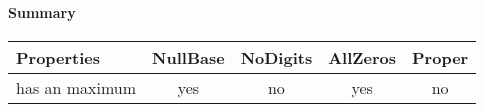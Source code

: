 \documentclass[\main/thesis.tex]{subfiles}
\begin{document}
\paragraph{Summary}

\begin{center}
    \begin{adjustbox}{max width=\textwidth}
    \begin{tabular}{ | l | c | c | c | c | }
    \textbf{Properties} & \textbf{NullBase} & \textbf{NoDigits} & \textbf{AllZeros} & \textbf{Proper} \\
    \hline
    has an maximum & yes & no & yes & no \\
    \end{tabular}
    \end{adjustbox}
\end{center}


%
%
%
%
%
%
%
%
%
%
\end{document}
